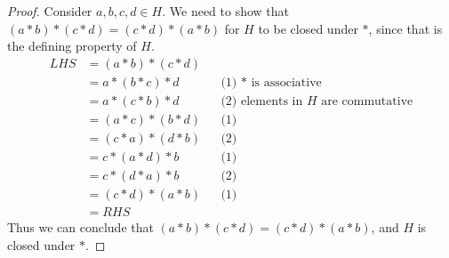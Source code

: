 \documentclass{article}
\begin{document}
\begin{proof}
    Consider $a,b,c,d \in H$. We need to show that $(a*b)*(c*d) = (c*d)*(a*b)$ for $H$ to be closed under $*$, since that is the defining property of $H$.
    \begin{align*}
        LHS & = (a*b)*(c*d) \\
        & = a*(b*c)*d && \text{(1) $*$ is associative} \\
        & = a*(c*b)*d && \text{(2) elements in $H$ are commutative} \\
        & = (a*c)*(b*d) && \text{(1)} \\
        & = (c*a)*(d*b) && \text{(2)} \\
        & = c*(a*d)*b && \text{(1)} \\
        & = c*(d*a)*b && \text{(2)} \\
        & = (c*d)*(a*b) && \text{(1)} \\
        & = RHS
    \end{align*}
    Thus we can conclude that $(a*b)*(c*d) = (c*d)*(a*b)$, and $H$ is closed under $*$.
\end{proof}
\end{document}
